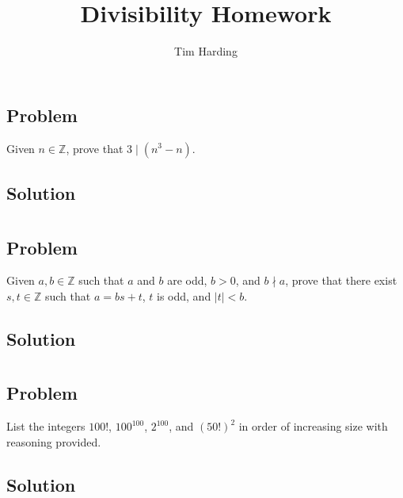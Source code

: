 \documentclass[12pt]{article}
\title{Divisibility Homework}
\author{Tim Harding}
\newcommand{\abs}  [1]{\left|       #1 \right|      }
\begin{document}
\maketitle

\section{}

\subsection{Problem}
Given $n \in \mathbb{Z}$, prove that $3 \mid (n^3 - n)$.

\subsection{Solution}



\section{}

\subsection{Problem}
Given $a, b \in \mathbb{Z}$ such that $a$ and $b$ are odd, $b > 0$, and $b \nmid a$, prove that there exist $s, t \in \mathbb{Z}$ such that $a = bs + t$, $t$ is odd, and $\abs{t} < b$.

\subsection{Solution}



\section{}

\subsection{Problem}
List the integers $100!$, $100^100$, $2^100$, and $(50!)^2$ in order of increasing size with reasoning provided.

\subsection{Solution}
\end{document}
